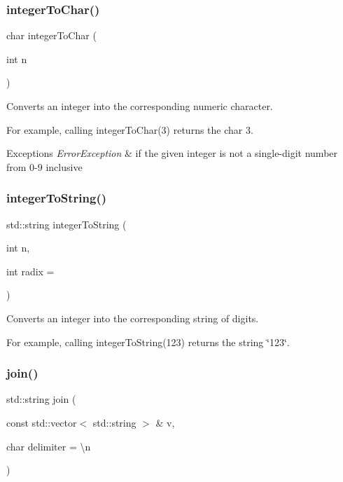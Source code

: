 \subsubsection{\texorpdfstring{integer\+To\+Char()}{integerToChar()}}
{\footnotesize\ttfamily char integer\+To\+Char (\begin{DoxyParamCaption}\item[{int}]{n }\end{DoxyParamCaption})}



Converts an integer into the corresponding numeric character. 

For example, calling {\ttfamily integer\+To\+Char(3)} returns the char {\ttfamily \textquotesingle{}3\textquotesingle{}}. 
\begin{DoxyExceptions}{Exceptions}
{\em Error\+Exception} & if the given integer is not a single-\/digit number from 0-\/9 inclusive \\
\hline
\end{DoxyExceptions}
\mbox{\label{namespacesgl_1_1priv_1_1strlib_a495a9775bf29121e1781cc2627f84484}} 
\subsubsection{\texorpdfstring{integer\+To\+String()}{integerToString()}}
{\footnotesize\ttfamily std\+::string integer\+To\+String (\begin{DoxyParamCaption}\item[{int}]{n,  }\item[{int}]{radix = {} }\end{DoxyParamCaption})}



Converts an integer into the corresponding string of digits. 

For example, calling {\ttfamily integer\+To\+String(123)} returns the string {\ttfamily \char`\"{}123\char`\"{}}. \mbox{\label{namespacesgl_1_1priv_1_1strlib_ae167c589e7dec5af5a4521f264017fd4}} 
\subsubsection{\texorpdfstring{join()}{join()}\hspace{0.1cm}{\footnotesize\ttfamily [1/2]}}
{\footnotesize\ttfamily std\+::string join (\begin{DoxyParamCaption}\item[{const std\+::vector$<$ std\+::string $>$ \&}]{v,  }\item[{char}]{delimiter = {\ttfamily \textquotesingle{}\textbackslash{}n\textquotesingle{}} }\end{DoxyParamCaption})}



